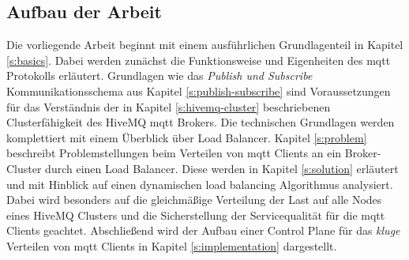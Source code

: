 \subsection{Aufbau der Arbeit}
Die vorliegende Arbeit beginnt mit einem ausführlichen Grundlagenteil in Kapitel \ref{s:basics}. Dabei werden zunächst die Funktionsweise und Eigenheiten des \ac{mqtt} Protokolls erläutert.
Grundlagen wie das \textit{Publish und Subscribe} Kommunikationsschema aus Kapitel \ref{s:publish-subscribe} sind Voraussetzungen für das Verständnis der in Kapitel \ref{s:hivemq-cluster} beschriebenen Clusterfähigkeit des HiveMQ \acs{mqtt} Brokers.
Die technischen Grundlagen werden komplettiert mit einem Überblick über Load Balancer.
Kapitel \ref{s:problem} beschreibt Problemstellungen beim Verteilen von \ac{mqtt} Clients an ein Broker-Cluster durch einen Load Balancer.
Diese werden in Kapitel \ref{s:solution} erläutert und mit Hinblick auf einen dynamischen load balancing Algorithmus analysiert. Dabei wird besonders auf die gleichmä{\ss}ige Verteilung der Last auf alle Nodes eines HiveMQ Clusters und die Sicherstellung der Servicequalität für die \ac{mqtt} Clients geachtet.
Abschlie{\ss}end wird der Aufbau einer Control Plane für das \textit{kluge} Verteilen von \ac{mqtt} Clients in Kapitel \ref{s:implementation} dargestellt.

\newpage
